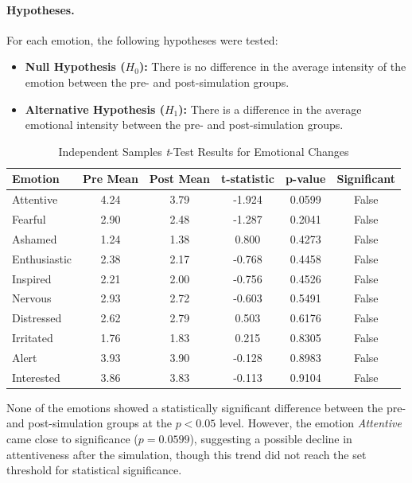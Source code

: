\paragraph{Hypotheses.} For each emotion, the following hypotheses were tested:

\begin{itemize}
    \item \textbf{Null Hypothesis ($H_0$):} There is no difference in the average intensity of the emotion between the pre- and post-simulation groups.
    \item \textbf{Alternative Hypothesis ($H_1$):} There is a difference in the average emotional intensity between the pre- and post-simulation groups.
\end{itemize}


\begin{table}[H]
\centering
\caption{Independent Samples \textit{t}-Test Results for Emotional Changes}
\begin{tabular}{|l|c|c|c|c|c|}
\hline
\textbf{Emotion} & \textbf{Pre Mean} & \textbf{Post Mean} & \textbf{t-statistic} & \textbf{p-value} & \textbf{Significant} \\
\hline
Attentive     & 4.24 & 3.79 & -1.924 & 0.0599 & False \\
Fearful       & 2.90 & 2.48 & -1.287 & 0.2041 & False \\
Ashamed       & 1.24 & 1.38 &  0.800 & 0.4273 & False \\
Enthusiastic  & 2.38 & 2.17 & -0.768 & 0.4458 & False \\
Inspired      & 2.21 & 2.00 & -0.756 & 0.4526 & False \\
Nervous       & 2.93 & 2.72 & -0.603 & 0.5491 & False \\
Distressed    & 2.62 & 2.79 &  0.503 & 0.6176 & False \\
Irritated     & 1.76 & 1.83 &  0.215 & 0.8305 & False \\
Alert         & 3.93 & 3.90 & -0.128 & 0.8983 & False \\
Interested    & 3.86 & 3.83 & -0.113 & 0.9104 & False \\
\hline
\end{tabular}
\label{tab:ttest_emotions}
\end{table}

None of the emotions showed a statistically significant difference between the pre- and post-simulation groups at the $p < 0.05$ level. However, the emotion \textit{Attentive} came close to significance ($p = 0.0599$), suggesting a possible decline in attentiveness after the simulation, though this trend did not reach the set threshold for statistical significance.

